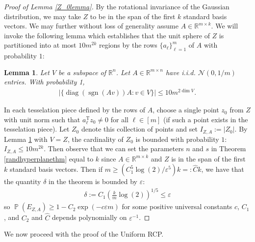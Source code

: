 \documentclass[11pt]{article}
\renewcommand{\epsilon}{\varepsilon}
\newcommand{\R}{\mathbb{R}}
\newcommand{\Pro}{\operatorname{\mathbb{P}}}
\newcommand{\sign}{\operatorname{sgn}}
\newcommand{\diag}{\operatorname{diag}}
\newcommand{\dimension}{\operatorname{dim}}
\renewcommand{\top}{{\mathrm{T}}}
\newtheorem{lem}{Lemma}
\theoremstyle{remark}
\begin{document}
\begin{proof}[Proof of Lemma \ref{Z_0lemma}]
By the rotational invariance of the Gaussian distribution, we may take $Z$ to be in the span of the first $k$ standard basis vectors. We may further without loss of generality assume $A \in \R^{m \times k}$. We will invoke the following lemma which establishes that the unit sphere of $Z$ is partitioned into at most $10m^{2k}$ regions by the rows $\{a_{\ell}\}_{\ell=1}^m$ of $A$ with probability $1$:

\begin{lem}\label{boundoncardAz}
Let $V$ be a subspace of $\R^n$. Let $A \in \R^{m \times n}$ have i.i.d. $\mathcal{N}(0,1/m)$ entries. With probability 1, \begin{align*}
|\{\diag(\sign(Av))A : v \in V\}| \leqslant 10m^{2\dimension V}.
\end{align*}
\end{lem}

In each tesselation piece defined by the rows of $A$, choose a single point $z_0$ from $Z$ with unit norm such that $a_{\ell}^{\top}z_0 \neq 0$ for all $\ell \in [m]$ (if such a point exists in the tesselation piece). Let $Z_0$ denote this collection of points and set $I_{Z,A} := |Z_0|$. By Lemma \ref{boundoncardAz} with $V = Z$, the cardinality of $Z_0$ is bounded with probability $1$: $I_{Z,A} \leqslant 10m^{2k}$. Then observe that we can set the parameters $n$ and $s$ in Theorem \ref{randhyperplanethm} equal to $k$ since $A \in \R^{m \times k}$ and $Z$ is in the span of the first $k$ standard basis vectors. Then if $m \geqslant \left(C_1^5\log(2)/\epsilon^5\right)k =: \hat{C} k$, we have that the quantity $\delta$ in the theorem is bounded by $\epsilon$: \begin{align*}
    \delta := C_1 \left(\frac{k}{m}\log(2)\right)^{1/5} \leqslant  \epsilon
\end{align*} so $\Pro(E_{Z,A}) \geqslant 1 - C_2 \exp(-c\epsilon m)$ for some positive universal constants $c$, $C_1$, and $C_2$ and $\hat{C}$ depends polynomially on $\epsilon^{-1}$.
\end{proof}

We now proceed with the proof of the Uniform RCP.
\end{document}
